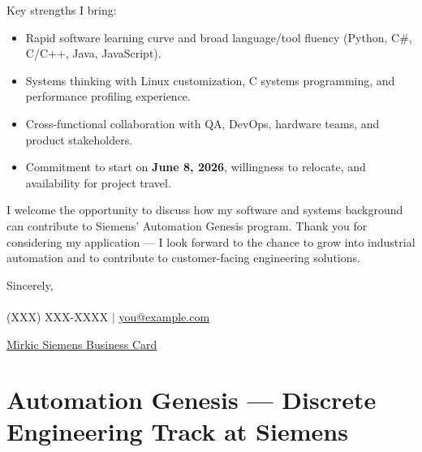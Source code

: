 \documentclass[11pt]{article}
\begin{document}
\vspace{6pt}

\noindent Key strengths I bring:
\begin{itemize}
  \item Rapid software learning curve and broad language/tool fluency (Python, C\#, C/C++, Java, JavaScript).
  \item Systems thinking with Linux customization, C systems programming, and performance profiling experience.
  \item Cross-functional collaboration with QA, DevOps, hardware teams, and product stakeholders.
  \item Commitment to start on \textbf{June 8, 2026}, willingness to relocate, and availability for project travel.
\end{itemize}

\noindent I welcome the opportunity to discuss how my software and systems background can contribute to Siemens' Automation Genesis program. Thank you for considering my application — I look forward to the chance to grow into industrial automation and to contribute to customer-facing engineering solutions.

\vspace{12pt}

\noindent Sincerely,\\[4pt]
 \\
\noindent (XXX) XXX-XXXX \; $|$ \; \href{mailto:you@example.com}{you@example.com}



\href{https://www.idea-company.siemens.cloud/businesscard/?id=YW8jUhV8}{Mirkic Siemens Business Card}


































\newpage

\section*{Automation Genesis --- Discrete Engineering Track at Siemens}
\end{document}
